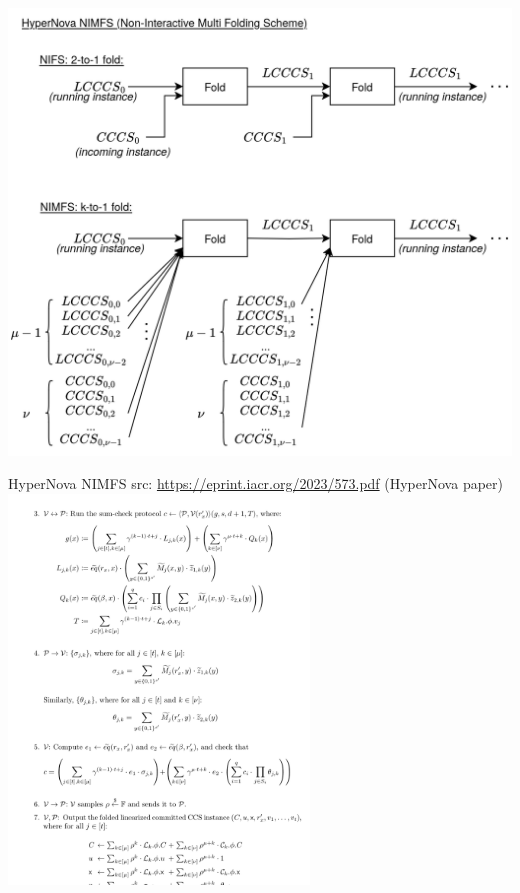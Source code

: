 \documentclass[t]{beamer} \usefonttheme[onlymath]{serif}
\begin{document}
\begin{frame}
  \includegraphics[height=\textheight]{multifolding-idea}
\end{frame}

\begin{frame}{HyperNova NIMFS}
  {\tiny src: \href{https://eprint.iacr.org/2023/573.pdf}{https://eprint.iacr.org/2023/573.pdf} (HyperNova paper)}
  \vspace{-0.5cm}
  \includegraphics[width=8cm]{./imgs/hypernova-screenshot}
\end{frame}
\end{document}

